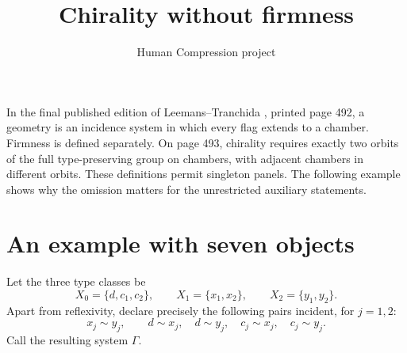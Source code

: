 \documentclass[11pt]{article}
\title{Chirality without firmness}
\author{Human Compression project}
\date{}
\begin{document}
\maketitle

In the final published edition of Leemans--Tranchida \cite{LT}, printed
page 492, a geometry is an incidence system in which every flag extends
to a chamber. Firmness is defined separately. On page 493, chirality
requires exactly two orbits of the full type-preserving group on
chambers, with adjacent chambers in different orbits. These definitions
permit singleton panels. The following example shows why the omission
matters for the unrestricted auxiliary statements.

\section{An example with seven objects}
Let the three type classes be
\[
 X_0=\{d,c_1,c_2\},\qquad X_1=\{x_1,x_2\},\qquad
 X_2=\{y_1,y_2\}.
\]
Apart from reflexivity, declare precisely the following pairs incident,
for $j=1,2$:
\[
 x_j\sim y_j,\qquad d\sim x_j,\quad d\sim y_j,
 \quad c_j\sim x_j,\quad c_j\sim y_j.                 \tag{1}
\]
Call the resulting system $\Gamma$.
\end{document}

